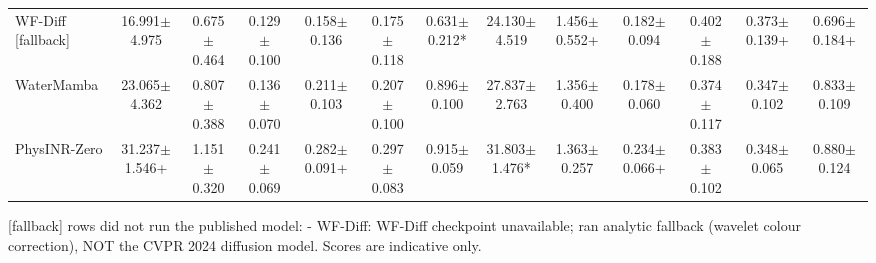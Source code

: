 \documentclass[journal]{IEEEtran}
\begin{document}
\begin{table}
{\begin{tabular}{lcccccccccccc}
WF-Diff [fallback] & 16.991$\pm$4.975 & 0.675$\pm$0.464 & 0.129$\pm$0.100 & 0.158$\pm$0.136 & 0.175$\pm$0.118 & 0.631$\pm$0.212* & 24.130$\pm$4.519 & 1.456$\pm$0.552+ & 0.182$\pm$0.094 & 0.402$\pm$0.188 & 0.373$\pm$0.139+ & 0.696$\pm$0.184+ \\
WaterMamba & 23.065$\pm$4.362 & 0.807$\pm$0.388 & 0.136$\pm$0.070 & 0.211$\pm$0.103 & 0.207$\pm$0.100 & 0.896$\pm$0.100 & 27.837$\pm$2.763 & 1.356$\pm$0.400 & 0.178$\pm$0.060 & 0.374$\pm$0.117 & 0.347$\pm$0.102 & 0.833$\pm$0.109 \\
PhysINR-Zero & 31.237$\pm$1.546+ & 1.151$\pm$0.320 & 0.241$\pm$0.069 & 0.282$\pm$0.091+ & 0.297$\pm$0.083 & 0.915$\pm$0.059 & 31.803$\pm$1.476* & 1.363$\pm$0.257 & 0.234$\pm$0.066+ & 0.383$\pm$0.102 & 0.348$\pm$0.065 & 0.880$\pm$0.124 \\
\bottomrule
\end{tabular}
}
\par\smallskip\footnotesize [fallback] rows did not run the published model:
- WF-Diff: WF-Diff checkpoint unavailable; ran analytic fallback (wavelet colour correction), NOT the CVPR 2024 diffusion model. Scores are indicative only.
\end{table}
\end{document}
